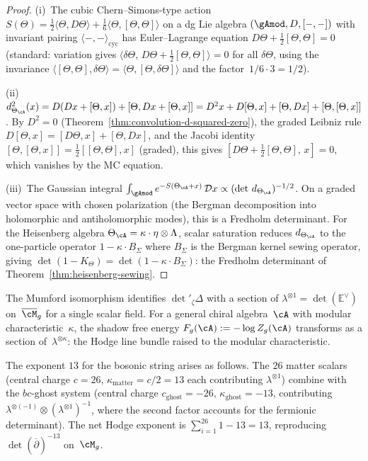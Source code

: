 \begin{proof}
(i)~The cubic Chern--Simons-type action
$S(\Theta) = \frac{1}{2}\langle\Theta, D\Theta\rangle
+ \frac{1}{6}\langle\Theta, [\Theta,\Theta]\rangle$
on a dg Lie algebra $(\gAmod, D, [{-},{-}])$ with
invariant pairing $\langle{-},{-}\rangle_{\mathrm{cyc}}$
has Euler--Lagrange equation
$D\Theta + \frac{1}{2}[\Theta,\Theta] = 0$
(standard: variation gives
$\langle \delta\Theta,\,
D\Theta + \frac{1}{2}[\Theta,\Theta]\rangle = 0$
for all $\delta\Theta$, using the invariance
$\langle[\Theta,\Theta],\delta\Theta\rangle
= \langle\Theta, [\Theta,\delta\Theta]\rangle$
and the factor~$1/6 \cdot 3 = 1/2$).

(ii)~$d_{\Theta_\cA}^2(x)
= D(Dx + [\Theta,x]) + [\Theta, Dx + [\Theta,x]]
= D^2 x + D[\Theta,x] + [\Theta,Dx] + [\Theta,[\Theta,x]]$.
By $D^2 = 0$
(Theorem~\ref{thm:convolution-d-squared-zero}),
the graded Leibniz rule
$D[\Theta,x] = [D\Theta,x] + [\Theta,Dx]$,
and the Jacobi identity
$[\Theta,[\Theta,x]] = \frac{1}{2}[[\Theta,\Theta],x]$
(graded), this gives
$[D\Theta + \frac{1}{2}[\Theta,\Theta],\, x] = 0$,
which vanishes by the MC equation.

(iii)~The Gaussian integral
$\int_{\gAmod} e^{-S(\Theta_\cA + x)}\,\mathcal{D}x
\propto (\det\, d_{\Theta_\cA})^{-1/2}$.
On a graded vector space with chosen polarization
(the Bergman decomposition into holomorphic and
antiholomorphic modes), this is a Fredholm determinant.
For the Heisenberg algebra
$\Theta_\cA = \kappa \cdot \eta \otimes \Lambda$,
scalar saturation reduces $d_{\Theta_\cA}$ to the
one-particle operator $1 - \kappa \cdot B_\Sigma$
where $B_\Sigma$ is the Bergman kernel sewing operator,
giving
$\det(1 - K_\Theta) = \det(1 - \kappa \cdot B_\Sigma)$:
the Fredholm determinant of
Theorem~\ref{thm:heisenberg-sewing}.
\end{proof}

\begin{remark}
\label{rem:mumford-shadow-exponent}
The Mumford isomorphism identifies $\det'{}_\zeta \Delta$
with a section of
$\lambda^{\otimes 1} = \det(\mathbb{E}^\vee)$
on~$\overline{\cM}_g$ for a single scalar field.
For a general chiral algebra~$\cA$ with modular
characteristic~$\kappa$, the shadow free energy
$F_g(\cA) := -\log Z_g(\cA)$ transforms as a section
of~$\lambda^{\otimes \kappa}$: the Hodge line bundle
raised to the modular characteristic.

The exponent $13$ for the bosonic string arises as follows.
The $26$ matter scalars (central charge $c = 26$,
$\kappa_{\mathrm{matter}} = c/2 = 13$ each contributing
$\lambda^{\otimes 1}$) combine with the $bc$-ghost system
(central charge $c_{\mathrm{ghost}} = -26$,
$\kappa_{\mathrm{ghost}} = -13$, contributing
$\lambda^{\otimes(-1)} \otimes (\lambda^{\otimes 1})^{-1}$,
where the second factor accounts for the fermionic
determinant).  The net Hodge exponent is
$\sum_{i=1}^{26} 1 - 13 = 13$, reproducing
$\det(\overline{\partial})^{-13}$ on~$\cM_g$.
\end{remark}

